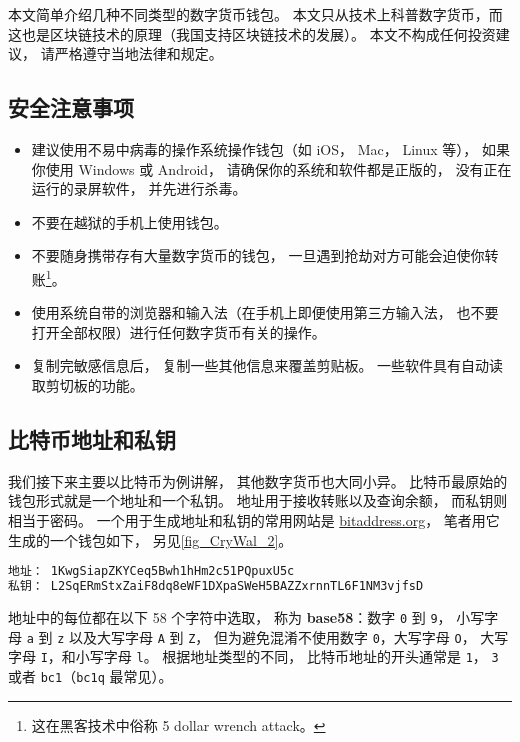 
本文简单介绍几种不同类型的数字货币钱包。 本文只从技术上科普数字货币，而这也是区块链技术的原理（我国支持区块链技术的发展）。 本文不构成任何投资建议， 请严格遵守当地法律和规定。

\subsection{安全注意事项}
\begin{itemize}
\item 建议使用不易中病毒的操作系统操作钱包（如 iOS， Mac， Linux 等）， 如果你使用 Windows 或 Android， 请确保你的系统和软件都是正版的， 没有正在运行的录屏软件， 并先进行杀毒。
\item 不要在越狱的手机上使用钱包。
\item 不要随身携带存有大量数字货币的钱包， 一旦遇到抢劫对方可能会迫使你转账\footnote{这在黑客技术中俗称 5 dollar wrench attack。}。
\item 使用系统自带的浏览器和输入法（在手机上即便使用第三方输入法， 也不要打开全部权限）进行任何数字货币有关的操作。
\item 复制完敏感信息后， 复制一些其他信息来覆盖剪贴板。 一些软件具有自动读取剪切板的功能。
\end{itemize}

\subsection{比特币地址和私钥}
我们接下来主要以比特币为例讲解， 其他数字货币也大同小异。 比特币最原始的钱包形式就是一个地址和一个私钥。 地址用于接收转账以及查询余额， 而私钥则相当于密码。 一个用于生成地址和私钥的常用网站是 \href{https://www.bitaddress.org/}{bitaddress.org}， 笔者用它生成的一个钱包如下， 另见\autoref{fig_CryWal_2}。
\begin{lstlisting}[language=bash]
地址： 1KwgSiapZKYCeq5Bwh1hHm2c51PQpuxU5c
私钥： L2SqERmStxZaiF8dq8eWF1DXpaSWeH5BAZZxrnnTL6F1NM3vjfsD
\end{lstlisting}

地址中的每位都在以下 58 个字符中选取， 称为 \textbf{base58}：数字 \verb`0` 到 \verb`9`， 小写字母 \verb`a` 到 \verb`z` 以及大写字母 \verb`A` 到 \verb`Z`， 但为避免混淆不使用数字 \verb`0`，大写字母 \verb`O`， 大写字母 \verb`I`，和小写字母 \verb`l`。 根据地址类型的不同， 比特币地址的开头通常是 \verb`1`， \verb`3` 或者 \verb`bc1`（\verb`bc1q` 最常见）。

